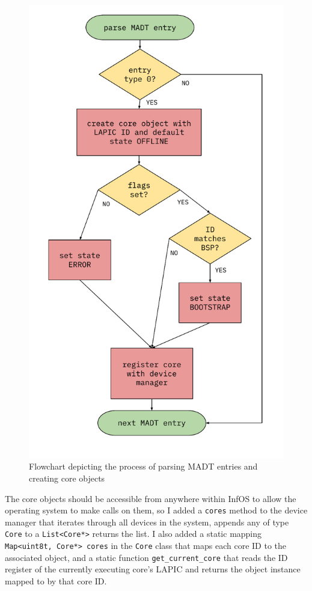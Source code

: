 \documentclass[bsc,frontabs,singlespacing,parskip,deptreport]{infthesis}
\begin{document}
\begin{figure}[h]
    \centering
    \includegraphics[scale=0.6]{figures/state-flowchart.pdf}
    \caption{Flowchart depicting the process of parsing MADT entries and creating core objects}
    \label{state-flowchart}
\end{figure}

 The core objects should be accessible from anywhere within InfOS to allow the operating system to make calls on them, so I added a \verb|cores| method to the device manager that iterates through all devices in the system, appends any of type \verb|Core| to a \verb|List<Core*>| returns the list. I also added a static mapping \verb|Map<uint8t, Core*> cores| in the \verb|Core| class that maps each core ID to the associated object, and a static function \verb|get_current_core| that reads the ID register of the currently executing core's LAPIC and returns the object instance mapped to by that core ID.
\end{document}
